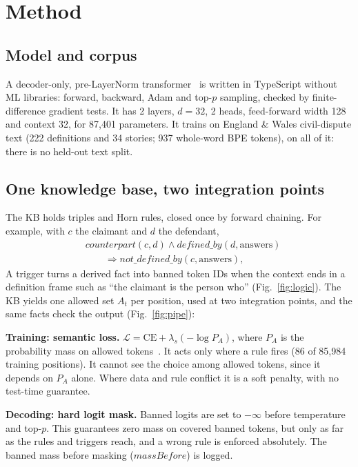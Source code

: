\documentclass[letterpaper, 10pt, conference]{IEEEtran}
\begin{document}
\section{Method}
\subsection{Model and corpus}
A decoder-only, pre-LayerNorm transformer~\cite{vaswani} is written in TypeScript without ML libraries: forward, backward, Adam and top-$p$ sampling, checked by finite-difference gradient tests. It has 2 layers, $d{=}32$, 2 heads, feed-forward width 128 and context 32, for 87,401 parameters. It trains on England \& Wales civil-dispute text (222 definitions and 34 stories; 937 whole-word BPE tokens), on all of it: there is no held-out text split.

\subsection{One knowledge base, two integration points}
The KB holds triples and Horn rules, closed once by forward chaining. For example, with $c$ the claimant and $d$ the defendant,
\[\begin{aligned}&\mathit{counterpart}(c,d)\wedge\mathit{defined\_by}(d,\mathrm{answers})\\&\qquad\Rightarrow\mathit{not\_defined\_by}(c,\mathrm{answers}),\end{aligned}\]
A trigger turns a derived fact into banned token IDs when the context ends in a definition frame such as ``the claimant is the person who'' (Fig.~\ref{fig:logic}). The KB yields one allowed set $A_t$ per position, used at two integration points, and the same facts check the output (Fig.~\ref{fig:pipe}):

\textbf{Training: semantic loss.} $\mathcal{L}=\mathrm{CE}+\lambda_s(-\log P_A)$, where $P_A$ is the probability mass on allowed tokens~\cite{xu2018,ahmed2023}. It acts only where a rule fires (86 of 85,984 training positions). It cannot see the choice among allowed tokens, since it depends on $P_A$ alone. Where data and rule conflict it is a soft penalty, with no test-time guarantee.

\textbf{Decoding: hard logit mask.} Banned logits are set to $-\infty$ before temperature and top-$p$. This guarantees zero mass on covered banned tokens, but only as far as the rules and triggers reach, and a wrong rule is enforced absolutely. The banned mass before masking ($\mathit{massBefore}$) is logged.
\end{document}
